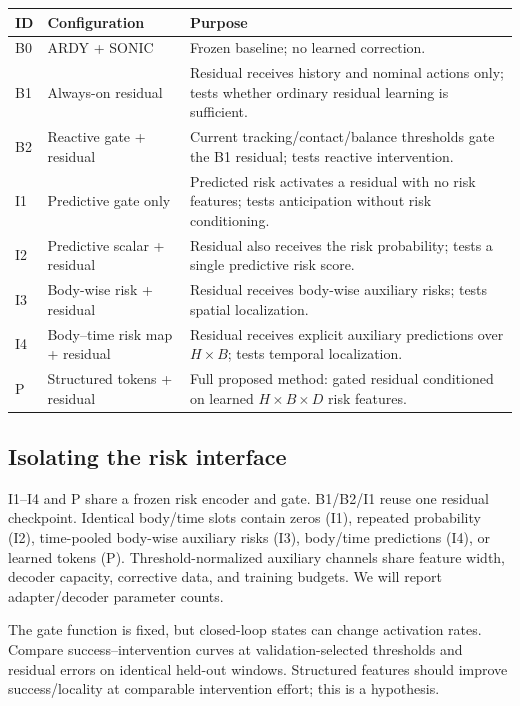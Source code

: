 \documentclass[11pt,a4paper]{article}
\begin{document}
\begingroup
\small
\renewcommand{\arraystretch}{1.13}
\begin{tabularx}{\linewidth}{@{}p{9mm}p{45mm}Y@{}}
\toprule
\textbf{ID} & \textbf{Configuration} & \textbf{Purpose} \\
\midrule
B0 & ARDY + SONIC & Frozen baseline; no learned correction. \\
B1 & Always-on residual & Residual receives history and nominal actions only; tests whether
ordinary residual learning is sufficient. \\
B2 & Reactive gate + residual & Current tracking/contact/balance thresholds
gate the B1 residual; tests reactive intervention. \\
I1 & Predictive gate only & Predicted risk activates a residual with no
risk features; tests anticipation without risk conditioning. \\
I2 & Predictive scalar + residual & Residual also receives the risk probability;
tests a single predictive risk score. \\
I3 & Body-wise risk + residual & Residual receives body-wise auxiliary risks;
tests spatial localization. \\
I4 & Body--time risk map + residual & Residual receives explicit auxiliary
predictions over $H\times B$; tests temporal localization. \\
P & Structured tokens + residual & Full proposed method: gated residual
conditioned on learned $H\times B\times D$ risk features. \\
\bottomrule
\end{tabularx}
\endgroup

\subsection{Isolating the risk interface}
I1--I4 and P share a frozen risk encoder and gate. B1/B2/I1 reuse one residual
checkpoint. Identical body/time slots contain zeros (I1), repeated probability
(I2), time-pooled body-wise auxiliary risks (I3), body/time predictions (I4),
or learned tokens (P). Threshold-normalized auxiliary channels share feature
width, decoder capacity, corrective data, and training budgets. We will report
adapter/decoder parameter counts.

The gate function is fixed, but closed-loop states can change activation rates.
Compare success--intervention curves at validation-selected thresholds and
residual errors on identical held-out windows. Structured features should
improve success/locality at comparable intervention effort; this is a hypothesis.
\end{document}
